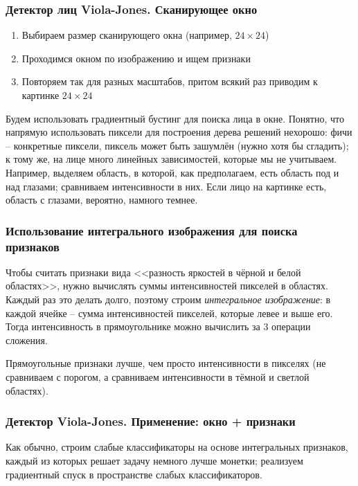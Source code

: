 \documentclass[main.tex]{subfiles}
\begin{document}
\subsubsection{ Детектор лиц Viola-Jones. Сканирующее окно }

\begin{enumerate}[noitemsep]
	\item Выбираем размер сканирующего окна (например, $ 24 \times 24 $)
	\item Проходимся окном по изображению и ищем признаки
	\item Повторяем так для разных масштабов, притом всякий раз приводим к картинке $ 24 \times 24 $
\end{enumerate}

Будем использовать градиентный бустинг для поиска лица в окне.
Понятно, что напрямую использовать пиксели для построения дерева решений нехорошо: фичи -- конкретные пиксели, пиксель может быть зашумлён (нужно хотя бы сгладить); к тому же, на лице много линейных зависимостей, которые мы не учитываем.
Например, выделяем область, в которой, как предполагаем, есть область под и над глазами; сравниваем интенсивности в них.
Если лицо на картинке есть, область с глазами, вероятно, намного темнее.

\subsubsection{Использование интегрального изображения для поиска признаков}

Чтобы считать признаки вида <<разность яркостей в чёрной и белой областях>>, нужно вычислять суммы интенсивностей пикселей в областях.
Каждый раз это делать долго, поэтому строим \emph{интегральное изображение}: в каждой ячейке -- сумма интенсивностей пикселей, которые левее и выше его.
Тогда интенсивность в прямоугольнике можно вычислить за 3 операции сложения.

Прямоугольные признаки лучше, чем просто интенсивности в пикселях (не сравниваем с порогом, а сравниваем интенсивности в тёмной и светлой областях).

\subsubsection{Детектор Viola-Jones. Применение: окно + признаки }

Как обычно, строим слабые классификаторы на основе интегральных признаков, каждый из которых решает задачу немного лучше монетки; реализуем градиентный спуск в пространстве слабых классификаторов.
\end{document}
